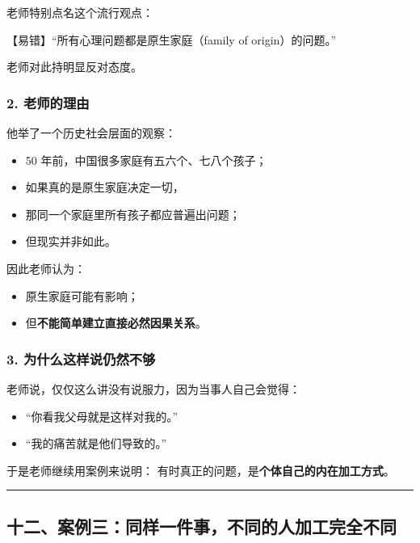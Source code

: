 \documentclass[
  chinese,
  9pt,
  a4paper,
]{ctexart}
\providecommand{\tightlist}{%
  \setlength{\itemsep}{0pt}\setlength{\parskip}{0pt}}
\begin{document}
老师特别点名这个流行观点：

【易错】``所有心理问题都是原生家庭（family of origin）的问题。''

老师对此持明显反对态度。

\subsubsection{2. 老师的理由}\label{ux8001ux5e08ux7684ux7406ux7531}

他举了一个历史社会层面的观察：

\begin{itemize}
\tightlist
\item
  50 年前，中国很多家庭有五六个、七八个孩子；
\item
  如果真的是原生家庭决定一切，
\item
  那同一个家庭里所有孩子都应普遍出问题；
\item
  但现实并非如此。
\end{itemize}

因此老师认为：

\begin{itemize}
\tightlist
\item
  原生家庭可能有影响；
\item
  但\textbf{不能简单建立直接必然因果关系}。
\end{itemize}

\subsubsection{3.
为什么这样说仍然不够}\label{ux4e3aux4ec0ux4e48ux8fd9ux6837ux8bf4ux4ecdux7136ux4e0dux591f}

老师说，仅仅这么讲没有说服力，因为当事人自己会觉得：

\begin{itemize}
\tightlist
\item
  ``你看我父母就是这样对我的。''
\item
  ``我的痛苦就是他们导致的。''
\end{itemize}

于是老师继续用案例来说明：
有时真正的问题，是\textbf{个体自己的内在加工方式}。

\begin{center}\rule{0.5\linewidth}{0.5pt}\end{center}

\subsection{十二、案例三：同样一件事，不同的人加工完全不同}\label{ux5341ux4e8cux6848ux4f8bux4e09ux540cux6837ux4e00ux4ef6ux4e8bux4e0dux540cux7684ux4ebaux52a0ux5de5ux5b8cux5168ux4e0dux540c}
\end{document}
